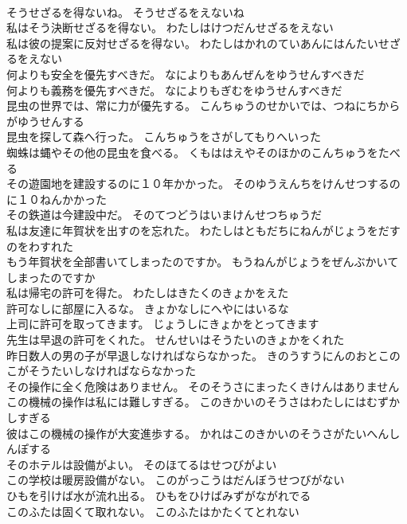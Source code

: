 \documentclass[8pt]{extreport}
\begin{document}
\begin{CJK}{UTF8}{min}
\\	そうせざるを得ないね。	そうせざるをえないね 
\\	私はそう決断せざるを得ない。	わたしはけつだんせざるをえない 
\\	私は彼の提案に反対せざるを得ない。	わたしはかれのていあんにはんたいせざるをえない 
\\	何よりも安全を優先すべきだ。	なによりもあんぜんをゆうせんすべきだ 
\\	何よりも義務を優先すべきだ。	なによりもぎむをゆうせんすべきだ 
\\	昆虫の世界では、常に力が優先する。	こんちゅうのせかいでは、つねにちからがゆうせんする 
\\	昆虫を探して森へ行った。	こんちゅうをさがしてもりへいった 
\\	蜘蛛は蝿やその他の昆虫を食べる。	くもははえやそのほかのこんちゅうをたべる 
\\	その遊園地を建設するのに１０年かかった。	そのゆうえんちをけんせつするのに１０ねんかかった 
\\	その鉄道は今建設中だ。	そのてつどうはいまけんせつちゅうだ 
\\	私は友達に年賀状を出すのを忘れた。	わたしはともだちにねんがじょうをだすのをわすれた 
\\	もう年賀状を全部書いてしまったのですか。	もうねんがじょうをぜんぶかいてしまったのですか 
\\	私は帰宅の許可を得た。	わたしはきたくのきょかをえた 
\\	許可なしに部屋に入るな。	きょかなしにへやにはいるな 
\\	上司に許可を取ってきます。	じょうしにきょかをとってきます 
\\	先生は早退の許可をくれた。	せんせいはそうたいのきょかをくれた 
\\	昨日数人の男の子が早退しなければならなかった。	きのうすうにんのおとこのこがそうたいしなければならなかった 
\\	その操作に全く危険はありません。	そのそうさにまったくきけんはありません 
\\	この機械の操作は私には難しすぎる。	このきかいのそうさはわたしにはむずかしすぎる 
\\	彼はこの機械の操作が大変進歩する。	かれはこのきかいのそうさがたいへんしんぽする 
\\	そのホテルは設備がよい。	そのほてるはせつびがよい 
\\	この学校は暖房設備がない。	このがっこうはだんぼうせつびがない 
\\	ひもを引けば水が流れ出る。	ひもをひけばみずがながれでる 
\\	このふたは固くて取れない。	このふたはかたくてとれない 

\end{CJK}
\end{document}
